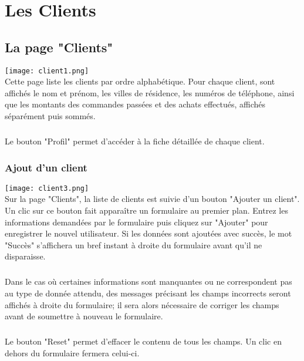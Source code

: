 \chapter{Les Clients}

\section{La page "Clients"}
\texttt{[image: client1.png]}\\
Cette page liste les clients par ordre alphabétique. Pour chaque client, sont
affichés le nom et prénom, les villes de résidence, les numéros de téléphone, 
ainsi que les montants des commandes passées et des achats effectués, affichés
séparément puis sommés.

\paragraph{}
Le bouton "Profil" permet d'accéder à la fiche détaillée de chaque client.

\subsection{Ajout d'un client}
\texttt{[image: client3.png]}\\
Sur la page "Clients", la liste de clients est suivie d'un bouton
"Ajouter un client". Un clic sur ce bouton fait apparaître un formulaire au
premier plan. Entrez les informations demandées par le formulaire puis cliquez
sur "Ajouter" pour enregistrer le nouvel utilisateur. Si les données sont
ajoutées avec succès, le mot "Succès" s'affichera un bref instant à droite du
formulaire avant qu'il ne disparaisse.

\paragraph{}
Dans le cas où certaines informations
sont manquantes ou ne correspondent pas au type de donnée attendu, des messages
précisant les champs incorrects seront affichés à droite du formulaire; il sera
alors nécessaire de corriger les champs avant de soumettre à nouveau le
formulaire.

\paragraph{}
Le bouton "Reset" permet d'effacer le contenu de tous les champs. Un clic en
dehors du formulaire fermera celui-ci.

